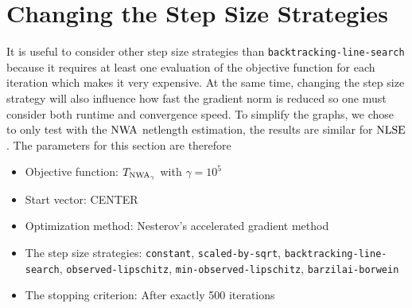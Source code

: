 \section{Changing the Step Size Strategies} \label{sec:changing_step_size_strategies}

It is useful to consider other step size strategies than \texttt{backtracking-line-search}
because it requires at least one evaluation of the objective function for each iteration which makes it very expensive.
At the same time, changing the step size strategy will also influence how fast the gradient norm is reduced
so one must consider both runtime and convergence speed.
To simplify the graphs, we chose to only test with the \(\operatorname{NWA}\) netlength estimation,
the results are similar for \(\operatorname{NLSE}\).
The parameters for this section are therefore
\begin{itemize}
 \item Objective function: \(T_{\operatorname{NWA}_\gamma}\) with \(\gamma = 10^5\)
 \item Start vector: CENTER
 \item Optimization method: Nesterov's accelerated gradient method
 \item The step size strategies: \texttt{constant}, \texttt{scaled-by-sqrt}, \texttt{backtracking-\allowbreak{}line-\allowbreak{}search}, \texttt{observed-\allowbreak{}lipschitz}, \texttt{min-\allowbreak{}observed-\allowbreak{}lipschitz}, \texttt{barzilai-\allowbreak{}borwein}
 \item The stopping criterion: After exactly 500 iterations
\end{itemize}

